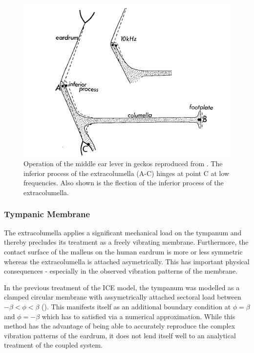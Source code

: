 \begin{figure}[ht]
 \centering
 \includegraphics[width=.7\linewidth]{Diagrams/manleyextracolumellaflection.png}
 \caption[Extracolumella Flection]{Operation of the middle ear lever in geckos reproduced from \cite{manleygecko2}. The inferior process of the extracolumella (A-C) 
 hinges at point C at low frequencies. Also shown is the flection of the inferior process of the extracolumella.}
 \label{extracolumellaflection}
\end{figure}

\subsubsection{Tympanic Membrane}
The extracolumella applies a significant 
mechanical load on the tympanum and thereby precludes its treatment as a freely vibrating membrane. 
Furthermore, the contact surface of the malleus on the human eardrum is more or less symmetric whereas the 
extracolumella is attached asymetrically. This has important physical consequences - especially in the 
observed vibration patterns of the membrane.

In the previous treatment of the ICE model, the tympanum was modelled as a clamped circular membrane with assymetrically
attached sectoral load between $-\beta<\phi<\beta$ (\cite{vossenjasa}). This manifests itself as an additional
boundary condition at $\phi=\beta$ and $\phi=-\beta$ which has to satisfied via a numerical approximation. While
this method has the advantage of being able to accurately reproduce the complex vibration patterns of the eardrum, 
it does not lend itself well to an analytical treatment of the coupled system.


